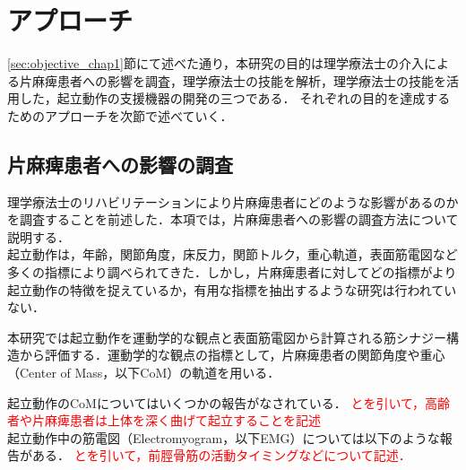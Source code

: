 \section{アプローチ}
\label{sec:approach_chap2}
\ref{sec:objective_chap1}節にて述べた通り，本研究の目的は理学療法士の介入による片麻痺患者への影響を調査，理学療法士の技能を解析，理学療法士の技能を活用した，起立動作の支援機器の開発の三つである．
それぞれの目的を達成するためのアプローチを次節で述べていく．\\

\subsection{片麻痺患者への影響の調査}
\label{subsec:investigate_chap2}

理学療法士のリハビリテーションにより片麻痺患者にどのような影響があるのかを調査することを前述した．本項では，片麻痺患者への影響の調査方法について説明する．\\

起立動作は，年齢，関節角度，床反力，関節トルク，重心軌道，表面筋電図など多くの指標により調べられてきた．しかし，片麻痺患者に対してどの指標がより起立動作の特徴を捉えているか，有用な指標を抽出するような研究は行われていない\cite{長田2012}．

本研究では起立動作を運動学的な観点と表面筋電図から計算される筋シナジー構造から評価する．運動学的な観点の指標として，片麻痺患者の関節角度や重心（Center of Mass，以下CoM）の軌道を用いる．

起立動作のCoMについてはいくつかの報告がなされている．
\textcolor{red}{\cite{Mourey2000}と\cite{Yang2017}を引いて，高齢者や片麻痺患者は上体を深く曲げて起立することを記述}
\\

起立動作中の筋電図（Electromyogram，以下EMG）については以下のような報告がある．
\textcolor{red}{\cite{Silva2013}と\cite{Gross1998}を引いて，前脛骨筋の活動タイミングなどについて記述．}\\

